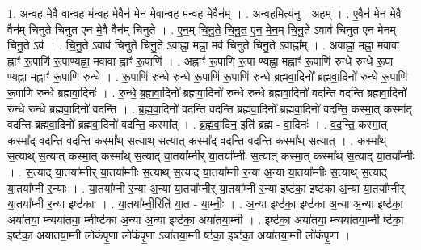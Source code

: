 \documentclass[17pt]{extarticle}
\begin{document}
1. अ॒न्व॒ह मे॒वै वान्व॒ह म॑न्व॒ह मे॒वैन॑ मेन मे॒वान्व॒ह म॑न्व॒ह मे॒वैन᳚म् । . अ॒न्व॒हमित्य॑नु - अ॒हम् । . ए॒वैन॑ मेन मे॒वै वैन॑म् चिनुते चिनुत एन मे॒वै वैन॑म् चिनुते । . ए॒न॒म् चि॒नु॒ते॒ चि॒नु॒त॒ ए॒न॒ मे॒न॒म् चि॒नु॒ते ऽवाव॑ चिनुत एन मेनम् चिनु॒ते ऽव॑ । . चि॒नु॒ते ऽवाव॑ चिनुते चिनु॒ते ऽवाह्ना॒ मह्ना॒ मव॑ चिनुते चिनु॒ते ऽवाह्ना᳚म् । . अवाह्ना॒ मह्ना॒ मवावा ह्नाꣳ॑ रू॒पाणि॑ रू॒पाण्यह्ना॒ मवावा ह्नाꣳ॑ रू॒पाणि॑ । . अह्नाꣳ॑ रू॒पाणि॑ रू॒पा ण्यह्ना॒ मह्नाꣳ॑ रू॒पाणि॑ रुन्धे रुन्धे रू॒पा ण्यह्ना॒ मह्नाꣳ॑ रू॒पाणि॑ रुन्धे । . रू॒पाणि॑ रुन्धे रुन्धे रू॒पाणि॑ रू॒पाणि॑ रुन्धे ब्रह्मवा॒दिनो᳚ ब्रह्मवा॒दिनो॑ रुन्धे रू॒पाणि॑ रू॒पाणि॑ रुन्धे ब्रह्मवा॒दिनः॑ । . रु॒न्धे॒ ब्र॒ह्म॒वा॒दिनो᳚ ब्रह्मवा॒दिनो॑ रुन्धे रुन्धे ब्रह्मवा॒दिनो॑ वदन्ति वदन्ति ब्रह्मवा॒दिनो॑ रुन्धे रुन्धे ब्रह्मवा॒दिनो॑ वदन्ति । . ब्र॒ह्म॒वा॒दिनो॑ वदन्ति वदन्ति ब्रह्मवा॒दिनो᳚ ब्रह्मवा॒दिनो॑ वदन्ति॒ कस्मा॒त् कस्मा᳚द् वदन्ति ब्रह्मवा॒दिनो᳚ ब्रह्मवा॒दिनो॑ वदन्ति॒ कस्मा᳚त् । . ब्र॒ह्म॒वा॒दिन॒ इति॑ ब्रह्म - वा॒दिनः॑ । . व॒द॒न्ति॒ कस्मा॒त् कस्मा᳚द् वदन्ति वदन्ति॒ कस्मा᳚थ् स॒त्याथ् स॒त्यात् कस्मा᳚द् वदन्ति वदन्ति॒ कस्मा᳚थ् स॒त्यात् । . कस्मा᳚थ् स॒त्याथ् स॒त्यात् कस्मा॒त् कस्मा᳚थ् स॒त्याद् या॒तया᳚म्नीर् या॒तया᳚म्नीः स॒त्यात् कस्मा॒त् कस्मा᳚थ् स॒त्याद् या॒तया᳚म्नीः । . स॒त्याद् या॒तया᳚म्नीर् या॒तया᳚म्नीः स॒त्याथ् स॒त्याद् या॒तया᳚म्नी र॒न्या अ॒न्या या॒तया᳚म्नीः स॒त्याथ् स॒त्याद् या॒तया᳚म्नी र॒न्याः । . या॒तया᳚म्नी र॒न्या अ॒न्या या॒तया᳚म्नीर् या॒तया᳚म्नी र॒न्या इष्ट॑का॒ इष्ट॑का अ॒न्या या॒तया᳚म्नीर् या॒तया᳚म्नी र॒न्या इष्ट॑काः । . या॒तया᳚म्नी॒रिति॑ या॒त - या॒म्नीः॒ । . अ॒न्या इष्ट॑का॒ इष्ट॑का अ॒न्या अ॒न्या इष्ट॑का॒ अया॑तया॒ म्न्यया॑तया॒ म्नीष्ट॑का अ॒न्या अ॒न्या इष्ट॑का॒ अया॑तया॒म्नी । . इष्ट॑का॒ अया॑तया॒ म्न्यया॑तया॒म्नी ष्ट॑का॒ इष्ट॑का॒ अया॑तया॒म्नी लो॑कंपृ॒णा लो॑कंपृ॒णा ऽया॑तया॒म्नी ष्ट॑का॒ इष्ट॑का॒ अया॑तया॒म्नी लो॑कंपृ॒णा । \newline
\end{document}
